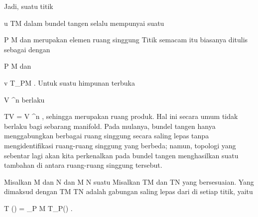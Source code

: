 Jadi, suatu titik

\mavergleichskette
{\vergleichskette
{ u
}
{ \in }{ TM
}
{  }{
}
{    }{
}
{   }{
}
}
{}{}{}
dalam bundel tangen selalu mempunyai suatu  {}

\mavergleichskette
{\vergleichskette
{ P
}
{ \in }{ M
}
{  }{
}
{    }{
}
{   }{
}
}
{}{}{}
dan merupakan elemen ruang singgung
Titik semacam itu biasanya ditulis sebagai
 dengan

\mavergleichskette
{\vergleichskette
{ P
}
{ \in }{ M
}
{  }{
}
{    }{
}
{   }{
}
}
{}{}{}
dan

\mavergleichskette
{\vergleichskette
{ v
}
{ \in }{ T_PM
}
{  }{
}
{    }{
}
{   }{
}
}
{}{}{.}
Untuk suatu himpunan terbuka

\mavergleichskette
{\vergleichskette
{ V
}
{ \subseteq }{ \R^n
}
{  }{
}
{    }{
}
{   }{
}
}
{}{}{}
berlaku

\mavergleichskette
{\vergleichskette
{ TV
}
{ = }{ V \times \R^n
}
{  }{
}
{    }{
}
{   }{
}
}
{}{}{,}
sehingga merupakan ruang produk. Hal ini secara umum tidak berlaku bagi sebarang manifold. Pada mulanya, bundel tangen hanya menggabungkan berbagai ruang singgung secara saling lepas tanpa mengidentifikasi ruang-ruang singgung yang berbeda; namun, topologi yang sebentar lagi akan kita perkenalkan pada bundel tangen menghasilkan suatu  tambahan di antara ruang-ruang singgung tersebut.

{}
{

Misalkan
\mathkor {} {M} {dan} {N} {}
dan
\maabbdisp {\varphi} { M } { N
} {}
suatu
Misalkan
\mathkor {} {TM} {dan} {TN} {}
yang bersesuaian. Yang dimaksud dengan 
 {TM} {TN
} {}
adalah gabungan saling lepas dari
di setiap titik, yaitu

\mavergleichskettedisp
{\vergleichskette
{ T (\varphi)
}
{ =} { \biguplus_{P \in M} T_P(\varphi)
}
{ } {
}
{ } {
}
{ } {
}
}
{}{}{.}

}

